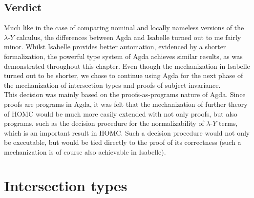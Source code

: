 \documentclass[a4paper, 12pt, twoside]{style/ociamthesis}
\theoremstyle{plain}
\theoremstyle{definition}
\theoremstyle{remark}
\newcommand{\lamy}{\lambda\text{-}Y}
\begin{document}
\section{Verdict}\label{verdict}

Much like in the case of comparing nominal and locally nameless versions
of the \(\lamy\) calculus, the differences between Agda and Isabelle
turned out to me fairly minor. Whilst Isabelle provides better
automation, evidenced by a shorter formalization, the powerful type
system of Agda achieves similar results, as was demonstrated throughout
this chapter. Even though the mechanization in Isabelle turned out to be
shorter, we chose to continue using Agda for the next phase of the
mechanization of intersection types and proofs of subject invariance.\\
This decision was mainly based on the proofs-as-programs nature of Agda.
Since proofs are programs in Agda, it was felt that the mechanization of
further theory of HOMC would be much more easily extended with not only
proofs, but also programs, such as the decision procedure for the
normalizability of \(\lamy\) terms, which is an important result in
HOMC. Such a decision procedure would not only be executable, but would
be tied directly to the proof of its correctness (such a mechanization
is of course also achievable in Isabelle).

\chapter{Intersection types}\label{intersection-types-1}

\label{chap:itypes}
\end{document}
